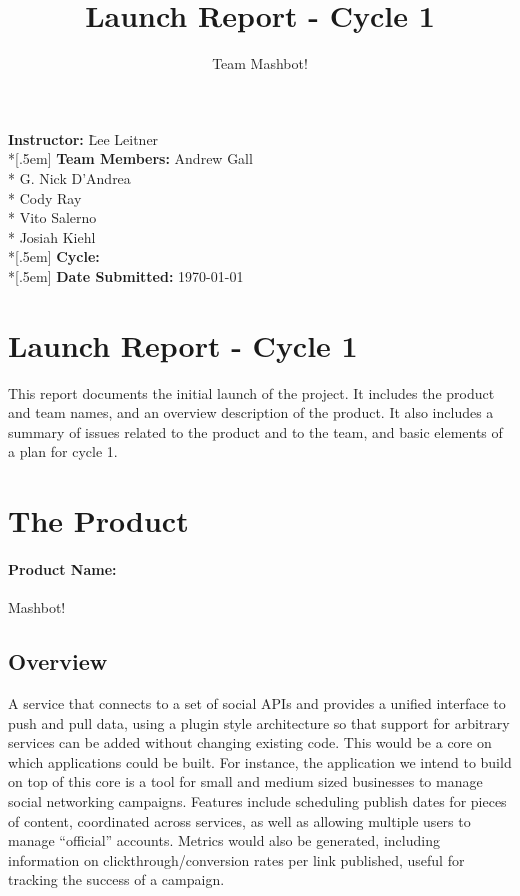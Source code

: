 \documentclass{article}
\title{Launch Report - Cycle 1}
\author{Team Mashbot!}
\begin{document}
\maketitle
\thispagestyle{empty}
\vfill
\begin{tabbing}
\noindent
\textbf{Instructor:} \hspace{3em} \= Lee Leitner \\*[.5em]
\textbf{Team Members:} \> Andrew Gall \\*
\> G. Nick D'Andrea \\*
\> Cody Ray \\*
\> Vito Salerno \\*
\> Josiah Kiehl \\*[.5em]
\textbf{Cycle:}   \\*[.5em]
\textbf{Date Submitted:} \> \today  \\
\end{tabbing}
\cleardoublepage

\section*{Launch Report - Cycle 1}

This report documents the initial launch of the project.  It includes the product and team names, and an overview description of the product.  It also includes a summary of issues related to the product and to the team, and basic elements of a plan for cycle 1.

\section*{The Product}

\paragraph*{Product Name:} Mashbot!

\subsection*{Overview}

A service that connects to a set of social APIs and provides a unified
interface to push and pull data, using a plugin style architecture so
that support for arbitrary services can be added without changing
existing code.  This would be a core on which applications could be
built.  For instance, the application we intend to build on top of
this core is a tool for small and medium sized businesses to manage
social networking campaigns. Features include scheduling publish dates
for pieces of content, coordinated across services, as well as
allowing multiple users to manage ``official'' accounts.  Metrics would
also be generated, including information on clickthrough/conversion
rates per link published, useful for tracking the success of a
campaign.
\end{document}
